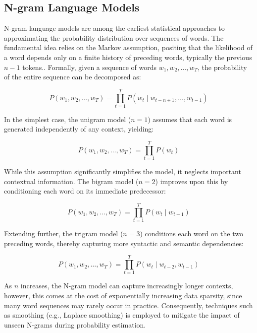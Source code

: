 \subsection{N-gram Language Models}
N-gram language models are among the earliest statistical approaches to approximating the probability distribution over sequences of words. The fundamental idea relies on the Markov assumption, positing that the likelihood of a word depends only on a finite history of preceding words, typically the previous $n-1$ tokens\citep{chen1999empirical}.. Formally, given a sequence of words $w_1, w_2, \dots, w_T$, the probability of the entire sequence can be decomposed as:

\begin{equation}
	P(w_1, w_2, \dots, w_T) = \prod_{t=1}^{T} P(w_t \mid w_{t-n+1}, \dots, w_{t-1})
\end{equation}

In the simplest case, the unigram model ($n=1$) assumes that each word is generated independently of any context, yielding:

\begin{equation}
	P(w_1, w_2, \dots, w_T) = \prod_{t=1}^{T} P(w_t)
\end{equation}

While this assumption significantly simplifies the model, it neglects important contextual information. The bigram model ($n=2$) improves upon this by conditioning each word on its immediate predecessor:

\begin{equation}
	P(w_1, w_2, \dots, w_T) = \prod_{t=1}^{T} P(w_t \mid w_{t-1})
\end{equation}

Extending further, the trigram model ($n=3$) conditions each word on the two preceding words, thereby capturing more syntactic and semantic dependencies:

\begin{equation}
	P(w_1, w_2, \dots, w_T) = \prod_{t=1}^{T} P(w_t \mid w_{t-2}, w_{t-1})
\end{equation}

As $n$ increases, the N-gram model can capture increasingly longer contexts, however, this comes at the cost of exponentially increasing data sparsity, since many word sequences may rarely occur in practice. Consequently, techniques such as smoothing (e.g., Laplace smoothing) \citep{chen1999empirical} is employed to mitigate the impact of unseen N-grams during probability estimation.

